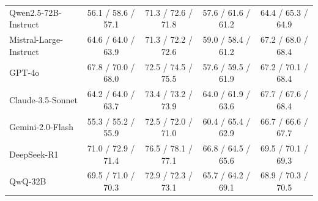 \documentclass{article}
\theoremstyle{plain}
\theoremstyle{definition}
\theoremstyle{remark}
\begin{document}
\begin{table}[h]
{\begin{tabular}{lcccc}
         Qwen2.5-72B-Instruct & 56.1 / 58.6 / 57.1 & 71.3 / 72.6 / 71.8 &  57.6 / 61.6 / 61.2 & 64.4 / 65.3 / 64.9 \\
         Mistral-Large-Instruct & 64.6 / 64.0 / 63.9 & 71.3 / 72.2 / 72.6 & 59.0 / 58.4 / 61.2 & 67.2 / 68.0 / 68.4 \\
         GPT-4o & 67.8 / 70.0 / 68.0 & 72.5 / 74.5 / 75.5 & 57.6 / 59.5 / 61.9 & 67.2 / 70.1 / 68.4 \\
         Claude-3.5-Sonnet & 64.2 / 64.0 / 63.7 & 73.4 / 73.2 / 73.9 & 64.0 / 61.9 / 63.6 & 67.7 / 67.6 / 68.4 \\
         Gemini-2.0-Flash & 55.3 / 55.2 / 55.9 & 72.5 / 72.0 / 71.0 & 60.4 / 65.4 / 62.9 & 66.7 / 66.6 / 67.7 \\
         DeepSeek-R1& 71.0 / 72.9 / 71.4 & 76.5 / 78.1 / 77.1 & 66.8 / 64.5 / 65.6 & 69.5 / 70.1 / 69.3 \\
         QwQ-32B& 69.5 / 71.0 / 70.3 & 72.9 / 72.3 / 73.1 & 65.7 / 64.2 / 69.1 & 68.9 / 70.3 / 70.5 \\
         \bottomrule
    \end{tabular}}
    \label{tab:per-annotator}
\end{table}
\end{document}
